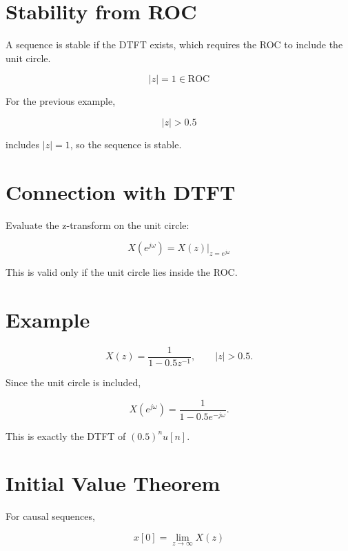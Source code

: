 \section{Stability from ROC}

A sequence is stable if the DTFT exists, which requires the ROC to include the unit circle.

\[
\boxed{
|z|=1 \in \text{ROC}
}
\]

For the previous example,

\[
|z|>0.5
\]

includes \(|z|=1\), so the sequence is stable.


\section{Connection with DTFT}

Evaluate the z-transform on the unit circle:

\[
\boxed{
X(e^{j\omega})=
X(z)\Big|_{z=e^{j\omega}}
}
\]

This is valid only if the unit circle lies inside the ROC.


\section{Example}

\[
X(z)=
\frac{1}{1-0.5z^{-1}},
\qquad
|z|>0.5.
\]

Since the unit circle is included,

\[
X(e^{j\omega})=
\frac{1}{1-0.5e^{-j\omega}}.
\]

This is exactly the DTFT of \((0.5)^n u[n]\).


\section{Initial Value Theorem}

For causal sequences,

\[
\boxed{
x[0]=
\lim_{z\to\infty}X(z)
}
\]


